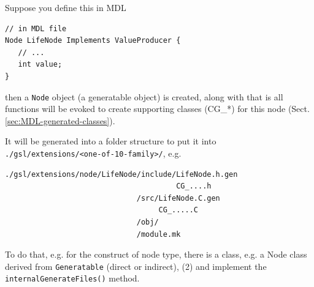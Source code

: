 \begin{mdframed}

Suppose you define this in MDL
\begin{verbatim}
// in MDL file
Node LifeNode Implements ValueProducer {
   // ...
   int value;
}
\end{verbatim}

then a \verb!Node! object (a generatable object) is created, along with that is all functions will be evoked to create supporting classes (CG\_*) for this node 
(Sect.\ref{sec:MDL-generated-classes}).

It will be generated into  a folder structure to put it into \verb!./gsl/extensions/<one-of-10-family>/!, e.g.
\begin{verbatim}
./gsl/extensions/node/LifeNode/include/LifeNode.h.gen
                                       CG_....h
                              /src/LifeNode.C.gen
                                   CG_.....C
                              /obj/
                              /module.mk
\end{verbatim}

To do that, e.g. for the construct of node type,
there is a class, e.g. a Node class derived from \verb!Generatable!
(direct or indirect), (2) and implement the \verb!internalGenerateFiles()!
method.
\end{mdframed}


